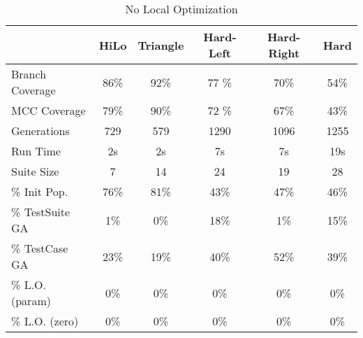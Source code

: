 \documentclass[runningheads]{llncs}
\begin{document}
\begin{table}[h!]
	\begin{center}
		
		\def\arraystretch{1.3}%
		\setlength\tabcolsep{1em}
		\begin{tabular}{| l | c  c  c  c c |}
			\hline
							 & HiLo  		 & Triangle		& Hard-Left	& 	Hard-Right 		& Hard		\\ \hline
			Branch Coverage	 & 86\%          & 92\%      	& 77 \%      	& 70\%          & 54\%      \\ \hline
			MCC Coverage	 & 79\%          & 90\%        	& 72 \%      	& 67\%          & 43\%      \\ \hline
			Generations		 & 729           & 579          & 1290       	& 1096          & 1255      \\ \hline
			Run Time		 & 2s          	 & 2s           & 7s       	 	& 7s          	& 19s       \\ \hhline{|=|=====|}
			
			Suite Size       & 7        	& 14       	 	& 24			& 19          	& 28        \\ \hline
			\% Init Pop.     & 76\%         & 81\%       	& 43\%       	& 47\%         	& 46\%      \\ \hline
			\% TestSuite GA  & 1\%          & 0\%       	& 18\%			& 1\%          	& 15\%       \\ \hline
			\% TestCase  GA  & 23\%         & 19\%       	& 40\%      	& 52\%         	& 39\%       \\ \hline
			\% L.O. (param)  & 0\%          & 0\%       	& 0\%			& 0\%          	& 0\%       \\ \hline
			\% L.O. (zero)   & 0\%          & 0\%       	& 0\%      		& 0\%         	& 0\%       \\ \hline
		\end{tabular}
	\end{center}
	\caption{No Local Optimization}  
	\label{tab:CovAll}
\end{table}
\end{document}

